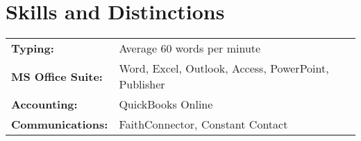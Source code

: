 \documentclass{article}
\begin{document}
\section{Skills and Distinctions}
\begin{tabular}{@{} l  l}
	\textbf{Typing:} 			& Average 60 words per minute \\
	\textbf{MS Office Suite:} 	& Word, Excel, Outlook, Access, PowerPoint, Publisher \\
	\textbf{Accounting:}		& QuickBooks Online \\
	\textbf{Communications:}	& FaithConnector, Constant Contact\\

	
\end{tabular}
\end{document}
